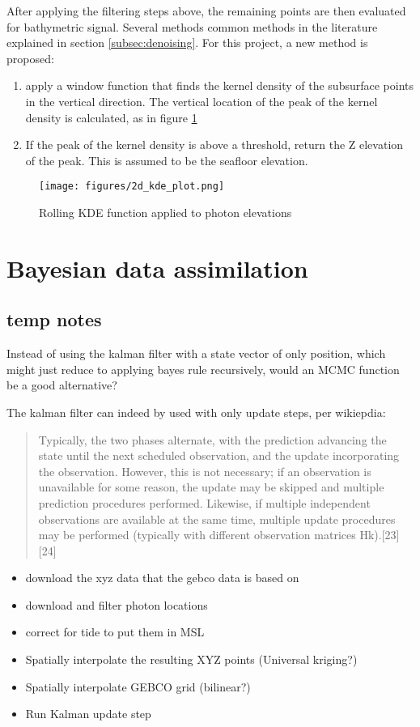 After applying the filtering steps above, the remaining points are then evaluated for bathymetric signal. Several methods common methods in the literature explained in section \ref{subsec:denoising}. For this project, a new method is proposed:


\begin{enumerate}
    \item apply a window function that finds the kernel density of the subsurface points in the vertical direction. The vertical location of the peak of the kernel density is calculated, as in figure \ref{fig:kdefunc}
    \item If the peak of the kernel density is above a threshold, return the Z elevation of the peak. This is assumed to be the seafloor elevation.
\end{enumerate}

\begin{figure}[htbp]
    \centering
    \texttt{[image: figures/2d\_kde\_plot.png]}
    \caption{Rolling KDE function applied to photon elevations}
    \label{fig:kdefunc}
\end{figure}

\section{Bayesian data assimilation}
\subsection*{temp notes}
Instead of using the kalman filter with a state vector of only position, which might just reduce to applying bayes rule recursively, would an MCMC function be a good alternative? 

The kalman filter can indeed by used with only update steps, per wikiepdia: 
\begin{quotation}
    Typically, the two phases alternate, with the prediction advancing the state until the next scheduled observation, and the update incorporating the observation. However, this is not necessary; if an observation is unavailable for some reason, the update may be skipped and multiple prediction procedures performed. Likewise, if multiple independent observations are available at the same time, multiple update procedures may be performed (typically with different observation matrices Hk).[23][24]
\end{quotation}
\begin{itemize}
    \color{orange}
    \item download the xyz data that the gebco data is based on
    \item download and filter photon locations
    \item correct for tide to put them in MSL
    \item Spatially interpolate the resulting XYZ points (Universal kriging?)
    \item Spatially interpolate GEBCO grid (bilinear?)
    \item Run Kalman update step  
\end{itemize}


